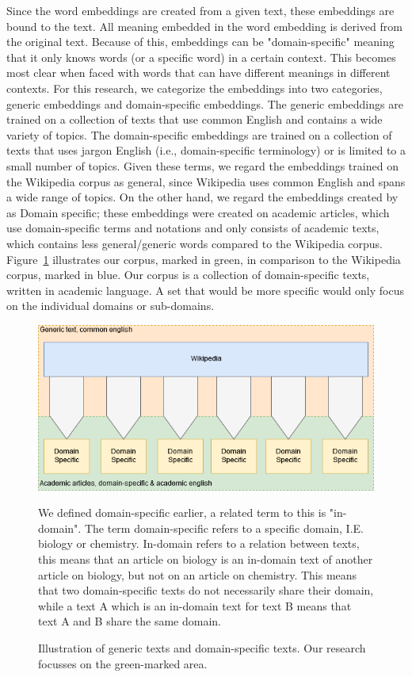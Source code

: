 \documentclass[../../Thesis.tex]{subfiles}
\begin{document}
Since the word embeddings are created from a given text, these embeddings are bound to the text. All meaning embedded in the word embedding is derived from the original text. Because of this, embeddings can be "domain-specific" meaning that it only knows words (or a specific word) in a certain context. This becomes most clear when faced with words that can have different meanings in different contexts. For this research, we categorize the embeddings into two categories, generic embeddings and domain-specific embeddings. The generic embeddings are trained on a collection of texts that use common English and contains a wide variety of topics. The domain-specific embeddings are trained on a collection of texts that uses jargon English (i.e., domain-specific terminology) or is limited to a small number of topics. Given these terms, we regard the embeddings trained on the Wikipedia corpus\cite{lai2016generate, pennington2014glove, dai2015document, lau2016empirical, schnabel2015evaluation} as general, since Wikipedia uses common English and spans a wide range of topics. On the other hand, we regard the embeddings created by \citet{Truong2017Thesis} as Domain specific; these embeddings were created on academic articles, which use domain-specific terms and notations and only consists of academic texts, which contains less general/generic words compared to the Wikipedia corpus. Figure~\ref{figure:domainPlot} illustrates our corpus, marked in green, in comparison to the Wikipedia corpus, marked in blue. Our corpus is a collection of domain-specific texts, written in academic language. A set that would be more specific would only focus on the individual domains or sub-domains.
\begin{figure}[hbt]
\includegraphics[width=6.5in]{Plots/domain_specification_graph}
\caption{Illustration of generic texts and domain-specific texts. Our research focusses on the green-marked area.}\label{figure:domainPlot}
We defined domain-specific earlier, a related term to this is "in-domain". The term domain-specific refers to a specific domain, I.E. biology or chemistry. In-domain refers to a relation between texts, this means that an article on biology is an in-domain text of another article on biology, but not on an article on chemistry. This means that two domain-specific texts do not necessarily share their domain, while a text A which is an in-domain text for text B means that text A and B share the same domain.
\end{figure}
\end{document}
